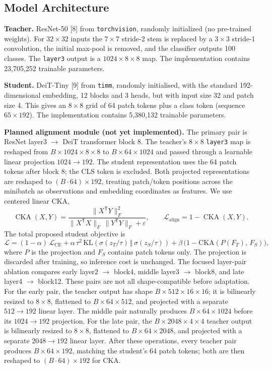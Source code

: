 \documentclass[11pt, letterpaper]{article}
\begin{document}
\subsection{Model Architecture}

\textbf{Teacher.} ResNet-50 [8] from \texttt{torchvision}, randomly initialized
(no pre-trained weights). For $32\times32$ inputs the $7\times7$ stride-2 stem
is replaced by a $3\times3$ stride-1 convolution, the initial max-pool is
removed, and the classifier outputs 100 classes. The \texttt{layer3} output is
a $1024\times8\times8$ map. The implementation contains 23,705,252 trainable
parameters.

\textbf{Student.} DeiT-Tiny [9] from \texttt{timm}, randomly initialised, with
the standard 192-dimensional embedding, 12 blocks and 3 heads, but with input
size 32 and patch size 4. This gives an $8\times8$ grid of 64 patch tokens plus
a class token (sequence $65\times192$). The implementation contains
5,380,132 trainable parameters.

\textbf{Planned alignment module (not yet implemented).} The primary pair is
ResNet layer3 $\rightarrow$ DeiT transformer block 8. The teacher's
$8\times8$ \texttt{layer3} map is reshaped from
$B\times1024\times8\times8$ to $B\times64\times1024$ and passed through a
learnable linear projection $1024\to192$. The student representation uses
the 64 patch tokens after block 8; the CLS token is excluded. Both projected
representations are reshaped to $(B\cdot64)\times192$, treating patch/token
positions across the minibatch as observations and embedding coordinates as
features. We use centered linear CKA,
\[
\operatorname{CKA}(X,Y)=
\frac{\lVert X^{\mathsf T}Y\rVert_F^2}
{\lVert X^{\mathsf T}X\rVert_F\,\lVert Y^{\mathsf T}Y\rVert_F+\varepsilon},
\qquad \mathcal{L}_{\mathrm{align}}=1-\operatorname{CKA}(X,Y).
\]
The total proposed student objective is
\[
\mathcal{L} = (1-\alpha)\,\mathcal{L}_{\text{CE}}
            + \alpha\,\tau^{2}\,\mathrm{KL}\!\left(\sigma(z_T/\tau)\,\Vert\,\sigma(z_S/\tau)\right)
            + \beta\,\bigl(1-\mathrm{CKA}(P(F_T),\,F_S)\bigr),
\]
where $P$ is the projection and $F_S$ contains patch tokens only. The
projection is discarded after training, so inference cost is unchanged. The
focused layer-pair ablation compares early layer2 $\rightarrow$ block4,
middle layer3 $\rightarrow$ block8, and late layer4 $\rightarrow$ block12.
These pairs are not all shape-compatible before adaptation. For the early pair,
the teacher output has shape $B\times512\times16\times16$; it is bilinearly
resized to $8\times8$, flattened to $B\times64\times512$, and projected with
a separate $512\to192$ linear layer. The middle pair naturally produces
$B\times64\times1024$ before its $1024\to192$ projection. For the late pair,
the $B\times2048\times4\times4$ teacher output is bilinearly resized to
$8\times8$, flattened to $B\times64\times2048$, and projected with a separate
$2048\to192$ linear layer. After these operations, every teacher pair produces
$B\times64\times192$, matching the student's 64 patch tokens; both are then
reshaped to $(B\cdot64)\times192$ for CKA.
\end{document}
